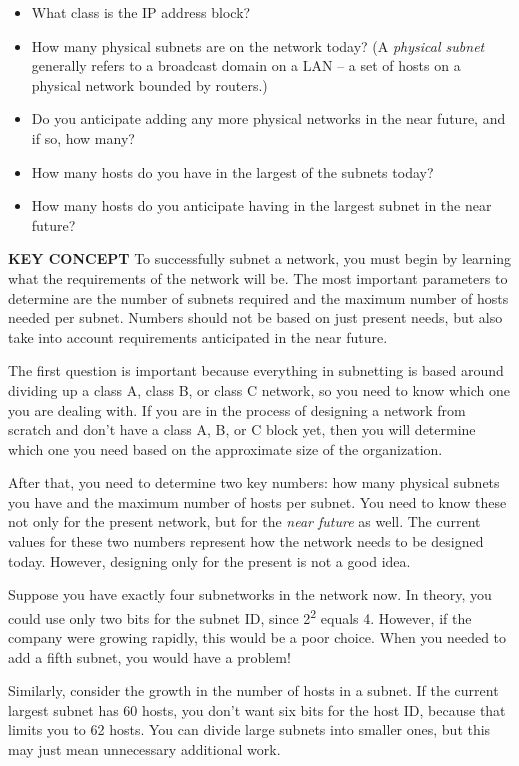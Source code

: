 \documentclass[b5paper,11pt]{memoir}
\begin{document}
\begin{itemize}
\item
  What class is the IP address block?
\item
  How many physical subnets are on the network today? (A {\emph{physical
  subnet}} generally refers to a broadcast domain on a LAN -- a set of
  hosts on a physical network bounded by routers.)
\item
  Do you anticipate adding any more physical networks in the near
  future, and if so, how many?
\item
  How many hosts do you have in the largest of the subnets today?
\item
  How many hosts do you anticipate having in the largest subnet in the
  near future?
\end{itemize}


{\textbf{KEY CONCEPT}} To successfully subnet a network, you must begin
by learning what the requirements of the network will be. The most
important parameters to determine are the number of subnets required and
the maximum number of hosts needed per subnet. Numbers should not be
based on just present needs, but also take into account requirements
anticipated in the near future.

The first question is important because everything in subnetting is
based around dividing up a class A, class B, or class C network, so you
need to know which one you are dealing with. If you are in the process
of designing a network from scratch and don't have a class A, B, or C
block yet, then you will determine which one you need based on the
approximate size of the organization.

After that, you need to determine two key numbers: how many physical
subnets you have and the maximum number of hosts per subnet. You need to
know these not only for the present network, but for the {\emph{near
future}} as well. The current values for these two numbers represent how
the network needs to be designed today. However, designing only for the
present is not a good idea.

Suppose you have exactly four subnetworks in the network now. In theory,
you could use only two bits for the subnet ID, since
2\textsuperscript{2} equals 4. However, if the company were growing
rapidly, this would be a poor choice. When you needed to add a fifth
subnet, you would have a problem!

Similarly, consider the growth in the number of hosts in a subnet. If
the current largest subnet has 60 hosts, you don't want six bits for the
host ID, because that limits you to 62 hosts. You can divide large
subnets into smaller ones, but this may just mean unnecessary additional
work.
\end{document}
